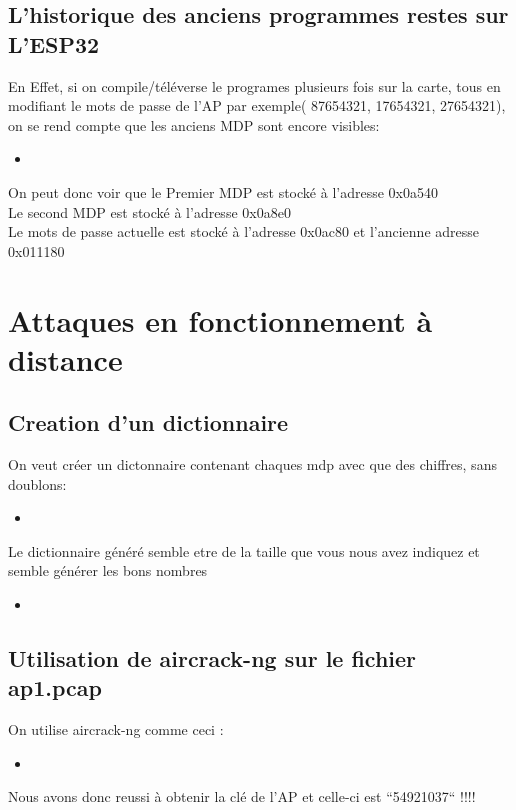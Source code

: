 \documentclass[10pt,a4paper]{article}
\newcommand{\insertcode}[2]{\begin{itemize}\item[]\end{itemize}}
\begin{document}
 \subsection{L'historique des anciens programmes restes sur L'ESP32}
 
 En Effet, si on compile/téléverse le programes plusieurs fois sur la carte, tous en modifiant le mots de passe de l'AP par exemple( 87654321, 17654321, 27654321), on se rend compte que les anciens MDP sont encore visibles:
 \insertcode{code/oldpPwd.txt}{On voit les anciens PWD}
 On peut donc voir que le Premier MDP est stocké à l'adresse 0x0a540\\
 Le second MDP est stocké à l'adresse 0x0a8e0\\
 Le mots de passe actuelle est stocké à l'adresse 0x0ac80 et l'ancienne adresse 0x011180
 \newpage
 \section{Attaques en fonctionnement à distance}
 \subsection{Creation d'un dictionnaire}
 On veut créer un dictonnaire contenant chaques mdp avec que des chiffres, sans doublons:
 \insertcode{code/genDico/genDico.py}{Mon générateur de dictionnaire}
Le dictionnaire généré semble etre de la taille que vous nous avez indiquez et semble générer les bons nombres
\insertcode{code/genDico/taille.txt}{Mon dictionnaire}\newpage
\subsection{Utilisation de aircrack-ng sur le fichier ap1.pcap}
On utilise aircrack-ng comme ceci :
\insertcode{code/aircrack.txt}{aircrack}
Nous avons donc reussi à obtenir la clé de l'AP et celle-ci est ``54921037`` !!!!
\end{document}
